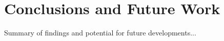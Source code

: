 \chapter{Conclusions and Future Work}
\label{chap:conclusions}

Summary of findings and potential for future developments...

